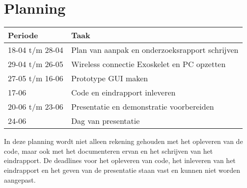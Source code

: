 \section{Planning}
{\renewcommand{\arraystretch}{1.5}
\begin{tabular}{ | l | l | }
	\hline
	\bfseries{Periode} & \bfseries{Taak} \\ \hline
	18-04 t/m 28-04 & Plan van aanpak en onderzoeksrapport schrijven\\ \hline
	29-04 t/m 26-05 & Wireless connectie Exoskelet en PC opzetten   \\ \hline
	27-05 t/m 16-06 & Prototype GUI maken \\ \hline
	17-06 & Code en eindrapport inleveren \\ \hline
	20-06 t/m 23-06 & Presentatie en demonstratie voorbereiden \\ \hline
	24-06 & Dag van presentatie \\ \hline
\end{tabular}
}

In deze planning wordt niet alleen rekening gehouden met het opleveren van de code, maar ook met het documenteren ervan en het schrijven van het eindrapport. De deadlines voor het opleveren van code, het inleveren van het eindrapport en het geven van de presentatie staan vast en kunnen niet worden aangepast.

